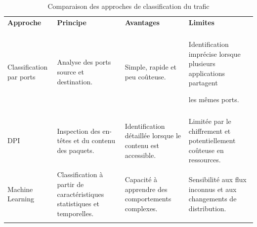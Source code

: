 \begin{table}[H]

\centering

\caption{Comparaison des approches de classification du trafic}

\label{tab:comparaison-approches}



\small

\begin{tabularx}{\textwidth}{|p{2.5cm}|Y|Y|Y|}

\hline

\textbf{Approche} &

\textbf{Principe} &

\textbf{Avantages} &

\textbf{Limites} \\\\

\hline



Classification par ports &

Analyse des ports source et destination. &

Simple, rapide et peu coûteuse. &

Identification imprécise lorsque plusieurs applications partagent

les mêmes ports. \\\\

\hline



DPI &

Inspection des en-têtes et du contenu des paquets. &

Identification détaillée lorsque le contenu est accessible. &

Limitée par le chiffrement et potentiellement coûteuse en ressources. \\\\

\hline



Machine Learning &

Classification à partir de caractéristiques statistiques et temporelles. &

Capacité à apprendre des comportements complexes. &

Sensibilité aux flux inconnus et aux changements de distribution. \\\\

\hline




\end{tabularx}
\end{table}

